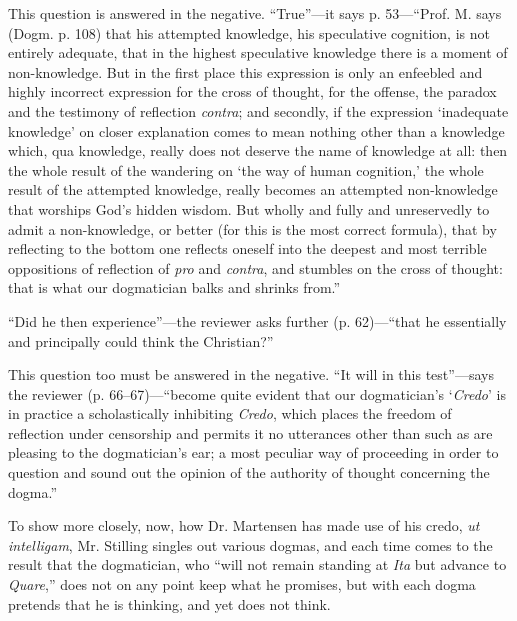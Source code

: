 \documentclass[12pt,a4paper,openany]{book}
\newcommand{\opage}[1]{\marginnote{\footnotesize\textit{[#1]}}}
\begin{document}
This question is answered in the negative. ``True''---it says
p. 53---``Prof. M. says (Dogm. p. 108) that his
attempted knowledge, his speculative cognition, is not entirely
adequate, that in the highest speculative knowledge there is a moment
of non-knowledge. But in the first place this expression is
only an enfeebled and highly incorrect expression for the cross of thought,
for the offense, the paradox and the testimony of reflection \textit{contra};
and secondly, if the expression `inadequate knowledge' on closer
explanation comes to mean nothing other than a
knowledge which, qua knowledge, really does not deserve the name of knowledge
at all: then the whole result of the wandering
on `the way of human cognition,' the whole result of
the attempted knowledge, really becomes an attempted non-knowledge that worships God's
hidden wisdom. But wholly and fully and unreservedly
to admit a non-knowledge, or better (for this is the
most correct formula), that by reflecting to the bottom one reflects
oneself into the deepest and most terrible oppositions of reflection
of \textit{pro} and \textit{contra}, and stumbles on the cross of thought: that %
is what our dogmatician balks and shrinks from.''

``Did he then experience''---the reviewer asks further (p.
62)---``that he essentially and principally could think
the Christian?''

This question too must be answered in the negative.
``It will in this test''---says the reviewer (p. 66--67)---``become quite evident that our dogmatician's
\setcounter{footnote}{0}%
\opage{22}`\textit{Credo}' is in practice a scholastically inhibiting \textit{Credo},
which places the freedom of reflection under censorship and permits
it no utterances other than such as are pleasing to the dogmatician's
ear; a most peculiar way of proceeding
in order to question and sound out the opinion of the authority of thought
concerning the dogma.''

To show more closely, now, how Dr. Martensen
has made use of his credo, \textit{ut intelligam}, Mr.
Stilling singles out various dogmas, and each time comes
to the result that the dogmatician, who ``will not remain standing
at \textit{Ita} but advance to \textit{Quare},'' does not on any point
keep what he promises, but with each dogma pretends that
he is thinking, and yet does not think.
\end{document}
